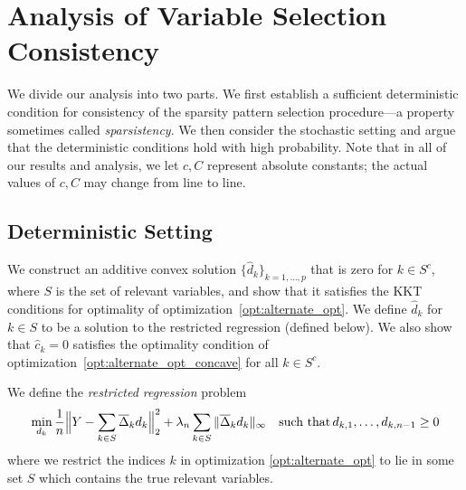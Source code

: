 \section{Analysis of Variable Selection Consistency}
\label{sec:finitesample}

We divide our analysis into two parts. We first establish a sufficient
deterministic condition for consistency of the sparsity pattern
selection procedure---a property sometimes called \textit{sparsistency}.
We then consider the
stochastic setting and argue that the deterministic conditions hold
with high probability. Note that in all of our results and analysis, we let $c,
C$ represent absolute constants; the actual values of $c,C$ may change from line to line.

\subsection{Deterministic Setting}

We construct an additive convex solution $\{\hat{d}_k\}_{k=1,\ldots,p}$
that is zero for $k \in S^c$, where $S$ is the set of relevant
variables, and show that it satisfies the KKT
conditions for optimality of optimization~\eqref{opt:alternate_opt}. We
define $\hat{d}_k$ for $k \in S$ to be a solution to the restricted
regression (defined below). We also show that $\hat{c}_k =
0$ satisfies the optimality condition of
optimization~\eqref{opt:alternate_opt_concave} for all $k \in S^c$.

\begin{definition}
\label{def:restricted_regression}
We define the \emph{restricted regression} problem 
\[
\min_{d_k} \frac{1}{n} \Big\| Y - \sum_{k \in S} \overline{\Delta}_k d_k \Big\|_2^2 + 
   \lambda_n \sum_{k \in S} \| \overline{\Delta}_k d_k \|_\infty \quad \textrm{such that} \, d_{k,1}, \ldots, d_{k,n-1} \geq 0
\]
where we restrict the indices $k$ in
optimization \eqref{opt:alternate_opt} to lie in some set $S$ which contains the true
relevant variables.
\end{definition}



